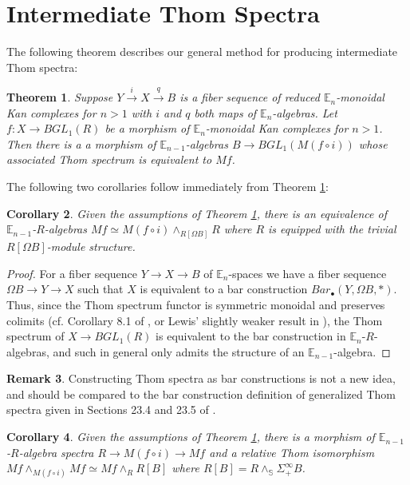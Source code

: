 \documentclass{article}
\theoremstyle{definition}
\newtheorem{rem}{Remark}
\theoremstyle{plain}
\newtheorem{thm}[rem]{Theorem}
\newtheorem{cor}[rem]{Corollary}
\newcommand{\sph}{\mathbb{S}}
\newcommand{\E}{\mathbb{E}}
\begin{document}
\section{Intermediate Thom Spectra}\label{its}

The following theorem describes our general method for producing intermediate Thom spectra:


\begin{thm}\label{mainthm}
Suppose $Y\overset{i}\to X\overset{q}\to B$ is a fiber sequence of reduced $\E_n$-monoidal Kan complexes for $n>1$ with $i$ and $q$ both maps of $\E_n$-algebras. Let $f\colon X\to BGL_1(R)$ be a morphism of $\E_n$-monoidal Kan complexes for $n>1$. Then there is a a morphism of $\E_{n-1}$-algebras $B\to BGL_1(M(f\circ i))$ whose associated Thom spectrum is equivalent to $Mf$. 
\end{thm}

The following two corollaries follow immediately from Theorem \ref{mainthm}:

\begin{cor}\label{quotiso}
Given the assumptions of Theorem \ref{mainthm}, there is an equivalence of $\E_{n-1}$-$R$-algebras $Mf\simeq M(f\circ i)\wedge_{R[\Omega B]} R$ where $R$ is equipped with the trivial $R[\Omega B]$-module structure. 
\end{cor}

\begin{proof}
For a fiber sequence $Y\to X\to B$ of $\E_n$-spaces we have a fiber sequence $\Omega B\to Y\to X$ such that $X$ is equivalent to a bar construction $Bar_\bullet(Y,\Omega B,\ast)$. Thus, since the Thom spectrum functor is symmetric monoidal and preserves colimits (cf. Corollary 8.1 of \cite{abg}, or Lewis' slightly weaker result in \cite{lewis}), the Thom spectrum of $X\to BGL_1(R)$ is equivalent to the bar construction in $\E_n$-$R$-algebras, and such in general only admits the structure of an $\E_{n-1}$-algebra.
\end{proof}

\begin{rem}
Constructing Thom spectra as bar constructions is not a new idea, and should be compared to the bar construction definition of generalized Thom spectra given in Sections 23.4 and 23.5 of \cite{maysig}. 
\end{rem}

\begin{cor}\label{thomiso}
Given the assumptions of Theorem \ref{mainthm}, there is a morphism of $\E_{n-1}$-$R$-algebra spectra $R\to M(f\circ i)\to Mf$ and a relative Thom isomorphism $Mf\wedge_{M(f\circ i)} Mf\simeq Mf\wedge_R R[B]$ where $R[B]=R\wedge_\sph\Sigma^\infty_+ B$. 
\end{cor}
\end{document}
